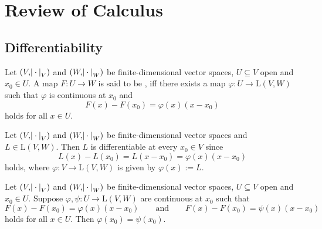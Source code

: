 \chapter{Review of Calculus}
\section*{Differentiability}

\begin{definition}
	Let $(V,\abs{\>\cdot\>}_V)$ and $(W,\abs{\>\cdot\>}_W)$ be finite-dimensional vector spaces, $U \subseteq V$ open and $x_0 \in U$. A map $F : U \to W$ is said to be , iff there exists a map $\varphi : U \to \mathrm{L}(V,W)$ such that $\varphi$ is continuous at $x_0$ and
	\begin{equation}
		\label{eq:differentiable}
		F(x) - F(x_0) = \varphi(x)(x - x_0)
	\end{equation}
	\noindent holds for all $x \in U$. 
\end{definition}

\begin{example}
	\label{ex:linear_map_differential}
	Let $(V,\abs{\>\cdot\>}_V)$ and $(W,\abs{\>\cdot\>}_W)$ be finite-dimensional vector spaces and $L \in \mathrm{L}(V,W)$. Then $L$ is differentiable at every $x_0 \in V$ since
	\begin{equation*}
		L(x) - L(x_0) = L(x - x_0) = \varphi(x)(x - x_0)
	\end{equation*}
	\noindent holds, where $\varphi : V \to \mathrm{L}(V,W)$ is given by $\varphi(x) := L$.
\end{example} 

\begin{proposition}
	Let $(V,\abs{\>\cdot\>}_V)$ and $(W,\abs{\>\cdot\>}_W)$ be finite-dimensional vector spaces, $U \subseteq V$ open and $x_0 \in U$. Suppose $\varphi,\psi : U \to \mathrm{L}(V,W)$ are continuous at $x_0$ such that  
	\begin{equation*}
		F(x) - F(x_0) = \varphi(x)(x - x_0) \qquad \text{and} \qquad F(x) - F(x_0) = \psi(x)(x - x_0)
	\end{equation*}	
	\noindent holds for all $x \in U$. Then $\varphi(x_0) = \psi(x_0)$.
\end{proposition}

